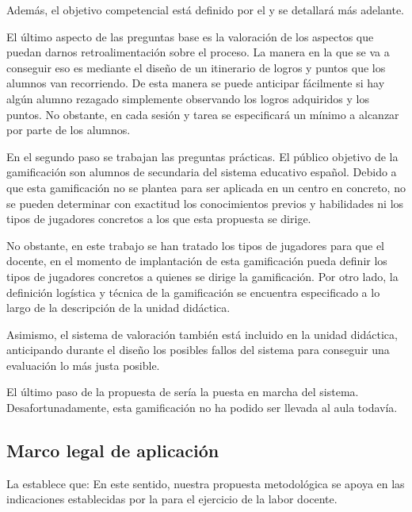Además, el objetivo competencial está definido por el \bocm y se detallará más adelante.

El último aspecto de las preguntas base es la valoración de los aspectos que puedan darnos retroalimentación sobre el proceso.
%
La manera en la que se va a conseguir eso es mediante el diseño de un itinerario de logros y puntos que los alumnos van recorriendo.
%
De esta manera se puede anticipar fácilmente si hay algún alumno rezagado simplemente observando los logros adquiridos y los puntos.
%
No obstante, en cada sesión y tarea se especificará un mínimo a alcanzar por parte de los alumnos.

En el segundo paso se trabajan las preguntas prácticas.
%
El público objetivo de la gamificación son alumnos de secundaria del sistema educativo español. 
%
Debido a que esta gamificación no se plantea para ser aplicada en un centro en concreto, no se pueden determinar con exactitud los conocimientos previos y habilidades ni los tipos de jugadores concretos a los que esta propuesta se dirige.

No obstante, en este trabajo se han tratado los tipos de jugadores para que el docente, en el momento de implantación de esta gamificación pueda definir los tipos de jugadores concretos a quienes se dirige la gamificación.
%
Por otro lado, la definición logística y técnica de la gamificación se encuentra especificado a lo largo de la descripción de la unidad didáctica. 

Asimismo, el sistema de valoración también está incluido en la unidad didáctica, anticipando durante el diseño los posibles fallos del sistema para conseguir una evaluación lo más justa posible.

El último paso de la propuesta de \cite{kapp2013gamification} sería la puesta en marcha del sistema. 
%
Desafortunadamente, esta gamificación no ha podido ser llevada al aula todavía.

\subsection{Marco legal de aplicación}

La \lomce establece que:  
%
En este sentido, nuestra propuesta metodológica se apoya en las indicaciones establecidas por la \lomce para el ejercicio de la labor docente.

